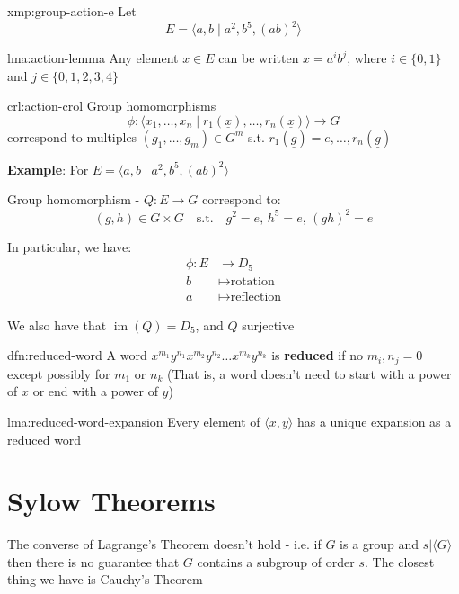 \documentclass{article}
\DeclareMathOperator{\Ima}{im}
\begin{document}
\begin{xmp}{xmp:group-action-e}{}
    Let
    \[E = \langle a, b \mid a^{2}, b^{5}, (ab)^{2} \rangle\]
\end{xmp}

\begin{lma}[]{lma:action-lemma}{}
    Any element $x\in E$ can be written $x = a^{i}b^{j}$, where $i\in \{0, 1\}$ and $j\in \{0,1,2,3,4\}$
\end{lma}

\begin{crl}[]{crl:action-crol}{}
    Group homomorphisms
    \[\phi : \langle  x_{1},\dots,x_{n} \mid r_{1}(\underline{x}),\dots,r_{n}(\underline{x}) \rangle \to G\]
    correspond to multiples $(g_{1},\dots,g_{m})\in G^{m}$ s.t. $r_{1}(\underline{g}) = e,\dots,r_{n}(\underline{g})$
\end{crl}

\textbf{Example}: For $E = \langle a,b \mid a^{2},b^{5},(ab)^{2} \rangle$

Group homomorphism - $Q : E \to G$ correspond to:
\[(g,h)\in G \times G \quad\text{s.t.}\quad g^{2}=e,\,h^{5}=e,\,(gh)^{2}=e\]

In particular, we have:
\begin{align*}
    \phi : E &\to D_{5}\\
    b &\mapsto \text{rotation}\\
    a &\mapsto \text{reflection}
\end{align*}

We also have that $\Ima(Q) = D_{5}$, and $Q$ surjective


\begin{dfn}{dfn:reduced-word}{}
    A word $x^{m_{1}}y^{n_{1}}x^{m_{2}}y^{n_{2}}\dots x^{m_{k}}y^{n_{k}}$ is \textbf{reduced} if no $m_{i},n_{j} = 0$ except possibly for $m_{1}$ or $n_{k}$ (That is, a word doesn't need to start with a power of $x$ or end with a power of $y$)
\end{dfn}

\begin{lma}[]{lma:reduced-word-expansion}{}
    Every element of $\langle x, y \rangle$ has a unique expansion as a reduced word
\end{lma}


\newpage
\section{Sylow Theorems}

The converse of Lagrange's Theorem doesn't hold - i.e. if $G$ is a group and $s | \langle G \rangle$ then there is no guarantee that $G$ contains a subgroup of order $s$. The closest thing we have is Cauchy's Theorem
\end{document}
